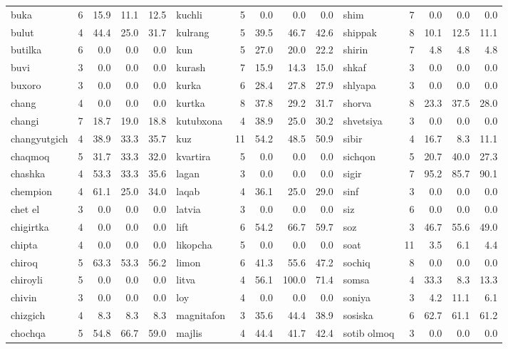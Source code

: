 \documentclass[a4paper,10pt]{article}
\begin{document}
\begin{longtable}{lrrrr|lrrrr|lrrrr}
buka & 6 & 15.9 & 11.1 & 12.5 & kuchli & 5 & 0.0 & 0.0 & 0.0 & shim & 7 & 0.0 & 0.0 & 0.0 \\
bulut & 4 & 44.4 & 25.0 & 31.7 & kulrang & 5 & 39.5 & 46.7 & 42.6 & shippak & 8 & 10.1 & 12.5 & 11.1 \\
butilka & 6 & 0.0 & 0.0 & 0.0 & kun & 5 & 27.0 & 20.0 & 22.2 & shirin & 7 & 4.8 & 4.8 & 4.8 \\
buvi & 3 & 0.0 & 0.0 & 0.0 & kurash & 7 & 15.9 & 14.3 & 15.0 & shkaf & 3 & 0.0 & 0.0 & 0.0 \\
buxoro & 3 & 0.0 & 0.0 & 0.0 & kurka & 6 & 28.4 & 27.8 & 27.9 & shlyapa & 3 & 0.0 & 0.0 & 0.0 \\
chang & 4 & 0.0 & 0.0 & 0.0 & kurtka & 8 & 37.8 & 29.2 & 31.7 & sho\textquotesingle{}rva & 8 & 23.3 & 37.5 & 28.0 \\
chang\textquotesingle{}i & 7 & 18.7 & 19.0 & 18.8 & kutubxona & 4 & 38.9 & 25.0 & 30.2 & shvetsiya & 3 & 0.0 & 0.0 & 0.0 \\
changyutgich & 4 & 38.9 & 33.3 & 35.7 & kuz & 11 & 54.2 & 48.5 & 50.9 & sibir & 4 & 16.7 & 8.3 & 11.1 \\
chaqmoq & 5 & 31.7 & 33.3 & 32.0 & kvartira & 5 & 0.0 & 0.0 & 0.0 & sichqon & 5 & 20.7 & 40.0 & 27.3 \\
chashka & 4 & 53.3 & 33.3 & 35.6 & lagan & 3 & 0.0 & 0.0 & 0.0 & sigir & 7 & 95.2 & 85.7 & 90.1 \\
chempion & 4 & 61.1 & 25.0 & 34.0 & laqab & 4 & 36.1 & 25.0 & 29.0 & sinf & 3 & 0.0 & 0.0 & 0.0 \\
chet el & 3 & 0.0 & 0.0 & 0.0 & latvia & 3 & 0.0 & 0.0 & 0.0 & siz & 6 & 0.0 & 0.0 & 0.0 \\
chigirtka & 4 & 0.0 & 0.0 & 0.0 & lift & 6 & 54.2 & 66.7 & 59.7 & so\textquotesingle{}z & 3 & 46.7 & 55.6 & 49.0 \\
chipta & 4 & 0.0 & 0.0 & 0.0 & likopcha & 5 & 0.0 & 0.0 & 0.0 & soat & 11 & 3.5 & 6.1 & 4.4 \\
chiroq & 5 & 63.3 & 53.3 & 56.2 & limon & 6 & 41.3 & 55.6 & 47.2 & sochiq & 8 & 0.0 & 0.0 & 0.0 \\
chiroyli & 5 & 0.0 & 0.0 & 0.0 & litva & 4 & 56.1 & 100.0 & 71.4 & somsa & 4 & 33.3 & 8.3 & 13.3 \\
chivin & 3 & 0.0 & 0.0 & 0.0 & loy & 4 & 0.0 & 0.0 & 0.0 & soniya & 3 & 4.2 & 11.1 & 6.1 \\
chizg\textquotesingle{}ich & 4 & 8.3 & 8.3 & 8.3 & magnitafon & 3 & 35.6 & 44.4 & 38.9 & sosiska & 6 & 62.7 & 61.1 & 61.2 \\
cho\textquotesingle{}chqa & 5 & 54.8 & 66.7 & 59.0 & majlis & 4 & 44.4 & 41.7 & 42.4 & sotib olmoq & 3 & 0.0 & 0.0 & 0.0 \\

\end{longtable}
\end{document}
